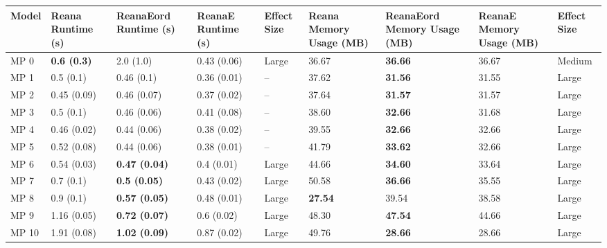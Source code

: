 \begin{tabular}{lllllllll}
\toprule
Model &  Reana Runtime (s) & ReanaEord Runtime (s) & ReanaE Runtime (s) & Effect Size & Reana Memory Usage (MB) & ReanaEord Memory Usage (MB) & ReanaE Memory Usage (MB) & Effect Size \\
\midrule
 MP 0 & \textbf{0.6 (0.3)} &             2.0 (1.0) &        0.43 (0.06) &       Large &                   36.67 &              \textbf{36.66} &                    36.67 &      Medium \\
 MP 1 &          0.5 (0.1) &            0.46 (0.1) &        0.36 (0.01) &          -- &                   37.62 &              \textbf{31.56} &                    31.55 &       Large \\
 MP 2 &        0.45 (0.09) &           0.46 (0.07) &        0.37 (0.02) &          -- &                   37.64 &              \textbf{31.57} &                    31.57 &       Large \\
 MP 3 &          0.5 (0.1) &           0.46 (0.06) &        0.41 (0.08) &          -- &                   38.60 &              \textbf{32.66} &                    31.68 &       Large \\
 MP 4 &        0.46 (0.02) &           0.44 (0.06) &        0.38 (0.02) &          -- &                   39.55 &              \textbf{32.66} &                    32.66 &       Large \\
 MP 5 &        0.52 (0.08) &           0.44 (0.06) &        0.38 (0.01) &          -- &                   41.79 &              \textbf{33.62} &                    32.66 &       Large \\
 MP 6 &        0.54 (0.03) &  \textbf{0.47 (0.04)} &         0.4 (0.01) &       Large &                   44.66 &              \textbf{34.60} &                    33.64 &       Large \\
 MP 7 &          0.7 (0.1) &   \textbf{0.5 (0.05)} &        0.43 (0.02) &       Large &                   50.58 &              \textbf{36.66} &                    35.55 &       Large \\
 MP 8 &          0.9 (0.1) &  \textbf{0.57 (0.05)} &        0.48 (0.01) &       Large &          \textbf{27.54} &                       39.54 &                    38.58 &       Large \\
 MP 9 &        1.16 (0.05) &  \textbf{0.72 (0.07)} &         0.6 (0.02) &       Large &                   48.30 &              \textbf{47.54} &                    44.66 &       Large \\
MP 10 &        1.91 (0.08) &  \textbf{1.02 (0.09)} &        0.87 (0.02) &       Large &                   49.76 &              \textbf{28.66} &                    28.66 &       Large \\

\end{tabular}
